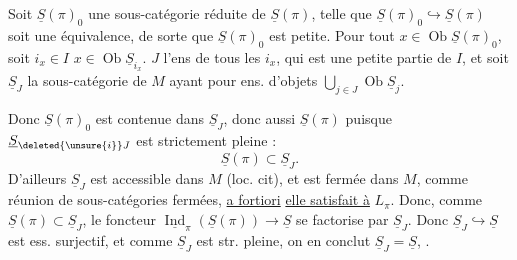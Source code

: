  Soit $\underline S(\pi)_0$ une sous-catégorie réduite
de $\underline S(\pi)$, telle que $\underline S(\pi)_0\hookrightarrow\underline S(\pi)$ soit
une équivalence, de sorte que $\underline S(\pi)_0$ est
petite. Pour tout $x\in\operatorname{Ob}\underline S(\pi)_0$, soit
$i_x\in I$  $x\in\operatorname{Ob}\underline S_{i_x}$. 
$J$ l'ens de tous les $i_x$, qui est
une petite partie de $I$, et soit
$\underline S_J$ la sous-catégorie  de $M$ ayant
pour  ens. d'objets $\bigcup_{j\in J}\operatorname{Ob}\underline S_j$.

 Donc $\underline S(\pi)_0$ est contenue
dans $\underline S_J$, donc aussi $\underline S(\pi)$ puisque
$\underline S_{\deleted{\unsure{i}}J}$ est strictement pleine :
\[
\underline S(\pi)\subset\underline S_J.
\]
D'ailleurs $\underline S_J$ est accessible dans $M$
(loc. cit), et est fermée dans $M$, comme
réunion de sous-catégories fermées, \uline{a fortiori}
\uline{elle satisfait à} $L_\pi$. Donc, comme $\underline S(\pi)\subset\underline S_J$,
le foncteur  $\underline{\operatorname{Ind}}_\pi(\underline S(\pi))\longrightarrow\underline S$ se
factorise par $\underline S_J$. Donc $\underline S_J\hookrightarrow\underline S$ est
ess. surjectif, et comme $\underline S_J$ est str.
pleine, on en conclut $\underline S_J=\underline S$, .
